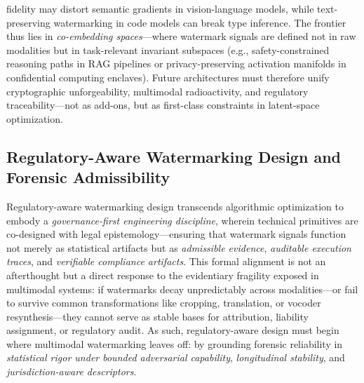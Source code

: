 \documentclass[11pt,a4paper]{article}
\begin{document}
fidelity may distort semantic gradients in vision-language models, while text-preserving watermarking in code models can break type inference. The frontier thus lies in \emph{co-embedding spaces}---where watermark signals are defined not in raw modalities but in task-relevant invariant subspaces (e.g., safety-constrained reasoning paths in RAG pipelines or privacy-preserving activation manifolds in confidential computing enclaves). Future architectures must therefore unify cryptographic unforgeability, multimodal radioactivity, and regulatory traceability---not as add-ons, but as first-class constraints in latent-space optimization.


\subsection{Regulatory-Aware Watermarking Design and Forensic Admissibility}


Regulatory-aware watermarking design transcends algorithmic optimization to embody a \emph{governance-first engineering discipline}, wherein technical primitives are co-designed with legal epistemology---ensuring that watermark signals function not merely as statistical artifacts but as \emph{admissible evidence}, \emph{auditable execution traces}, and \emph{verifiable compliance artifacts}. This formal alignment is not an afterthought but a direct response to the evidentiary fragility exposed in multimodal systems: if watermarks decay unpredictably across modalities---or fail to survive common transformations like cropping, translation, or vocoder resynthesis---they cannot serve as stable bases for attribution, liability assignment, or regulatory audit. As such, regulatory-aware design must begin where multimodal watermarking leaves off: by grounding forensic reliability in \emph{statistical rigor under bounded adversarial capability}, \emph{longitudinal stability}, and \emph{jurisdiction-aware descriptors}.
\end{document}
